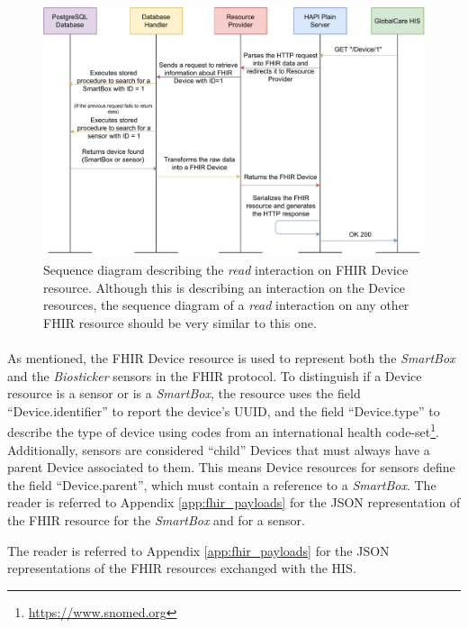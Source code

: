 \begin{figure}[H]
    \centering
    \includegraphics[width=\linewidth]{images/fhir get device.pdf}
    \caption[Sequence diagram describing the \textit{read} interaction on \acs{FHIR} Device resource.]{Sequence diagram describing the \textit{read} interaction on \acs{FHIR} Device resource. Although this is describing an interaction on the Device resources, the sequence diagram of a \textit{read} interaction on any other \acs{FHIR} resource should be very similar to this one.}
    \label{fig:fhir-get-device}
\end{figure} 

\paragraph{} As mentioned, the \acs{FHIR} Device resource is used to represent both the \textit{SmartBox} and the \textit{Biosticker} sensors in the \acs{FHIR} protocol. To distinguish if a Device resource is a sensor or is a \textit{SmartBox}, the resource uses the field ``Device.identifier'' to report the device's \acs{UUID}, and the field ``Device.type'' to describe the type of device using codes from an international health code-set\footnote{\url{https://www.snomed.org}}. Additionally, sensors are considered ``child'' Devices that must always have a parent Device associated to them. This means Device resources for sensors define the field ``Device.parent'', which must contain a reference to a \textit{SmartBox}. The reader is referred to Appendix \ref{app:fhir_payloads} for the \acs{JSON} representation of the \acs{FHIR} resource for the \textit{SmartBox} and for a sensor.

The reader is referred to Appendix \ref{app:fhir_payloads} for the \acs{JSON} representations of the \acs{FHIR} resources exchanged with the \acs{HIS}.

